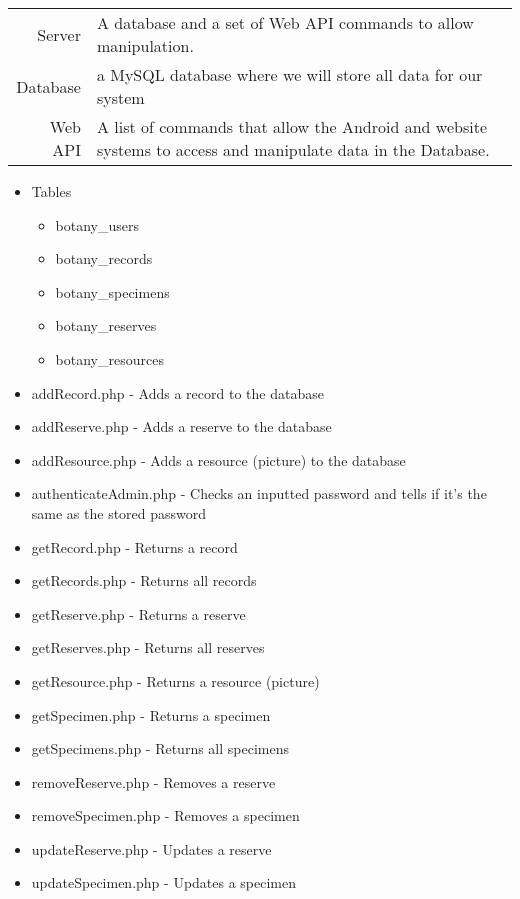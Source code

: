 	\begin{tabular}{r p{10cm}}
		Server & A database and a set of Web API commands to allow manipulation. \\
		Database & a MySQL database where we will store all data for our system \\
		Web API & A list of commands that allow the Android and website systems to access and manipulate data in the Database. \\
	\end{tabular}
	\begin{itemize}
		\item Tables 
		\begin{itemize}
			\item botany\_users
			\item botany\_records
			\item botany\_specimens
			\item botany\_reserves
			\item botany\_resources
		\end{itemize}
	\end{itemize}
	\begin{itemize}
		\item addRecord.php - Adds a record to the database
		\item addReserve.php - Adds a reserve to the database
		\item addResource.php - Adds a resource (picture) to the database
		\item  authenticateAdmin.php - Checks an inputted password and tells if it's the same as the stored password
		\item getRecord.php - Returns a record 
		\item getRecords.php - Returns all records
		\item getReserve.php - Returns a reserve
		\item getReserves.php - Returns all reserves
		\item getResource.php - Returns a resource (picture)
		\item getSpecimen.php - Returns a specimen
		\item getSpecimens.php - Returns all specimens
		\item removeReserve.php - Removes a reserve
		\item removeSpecimen.php - Removes a specimen
		\item updateReserve.php - Updates a reserve
		\item updateSpecimen.php - Updates a specimen
	\end{itemize}